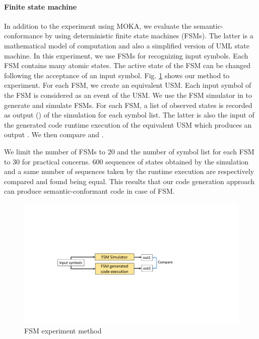 \paragraph{Finite state machine}
In addition to the experiment using MOKA, we evaluate the semantic-conformance by using deterministic finite state machines (FSMs). The latter is a mathematical model of computation and also a simplified version of UML state machine. In this experiment, we use FSMs for recognizing input symbols. Each FSM contains many atomic states. The active state of the FSM can be changed following the acceptance of an input symbol. Fig. \ref{fig:fsm} shows our method to experiment. For each FSM, we create an equivalent USM. Each input symbol of the FSM is considered as an event of the USM. We use the FSM simulator in \cite{fsmsim} to generate and simulate FSMs. For each FSM, a list of observed states is recorded as output () of the simulation for each symbol list. The latter is also the input of the generated code runtime execution of the equivalent USM which produces an output . We then compare  and .

We limit the number of FSMs to 20 and the number of symbol list for each FSM to 30 for practical concerns. 600 sequences of states obtained by the simulation and a same number of sequences taken by the runtime execution are respectively compared and found being equal. This results that our code generation approach can produce semantic-conformant code in case of FSM.

\begin{figure}
	\centering
	\includegraphics[clip, trim=4.5cm 7.6cm 10.25cm 8.0cm, width=0.85\columnwidth]{figures/fsm}
	\caption{FSM experiment method} 
	\label{fig:fsm}
\end{figure}






